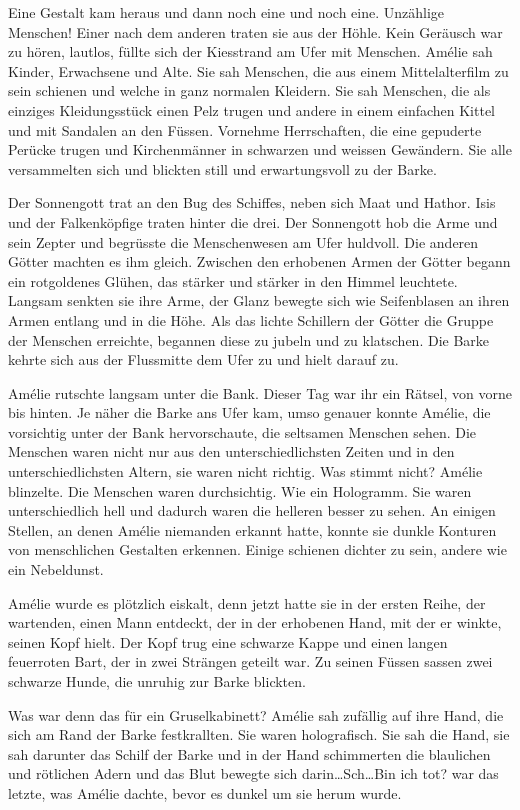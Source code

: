 \documentclass[11pt,titlepage,a5paper]{book}
\begin{document}
Eine Gestalt kam heraus und dann noch eine und noch eine. Unzählige Menschen! Einer nach dem anderen traten sie aus der Höhle. Kein Geräusch war zu hören, lautlos, füllte sich der Kiesstrand am Ufer mit Menschen. Amélie sah Kinder, Erwachsene und Alte. Sie sah Menschen, die aus einem Mittelalterfilm zu sein schienen und welche in ganz normalen Kleidern. Sie sah Menschen, die als einziges Kleidungsstück einen Pelz trugen und andere in einem einfachen Kittel und mit Sandalen an den Füssen. Vornehme Herrschaften, die eine gepuderte Perücke trugen und Kirchenmänner in schwarzen und weissen Gewändern. Sie alle versammelten sich und blickten still und erwartungsvoll zu der Barke. 

Der Sonnengott trat an den Bug des Schiffes, neben sich Maat und Hathor. Isis und der Falkenköpfige traten hinter die drei. Der Sonnengott hob die Arme und sein Zepter und begrüsste die Menschenwesen am Ufer huldvoll. Die anderen Götter machten es ihm gleich. Zwischen den erhobenen Armen der Götter begann ein rotgoldenes Glühen, das stärker und stärker in den Himmel leuchtete. Langsam senkten sie ihre Arme, der Glanz bewegte sich wie Seifenblasen an ihren Armen entlang und in die Höhe. Als das lichte Schillern der Götter die Gruppe der Menschen erreichte, begannen diese zu jubeln und zu klatschen. Die Barke kehrte sich aus der Flussmitte dem Ufer zu und hielt darauf zu. 

Amélie rutschte langsam unter die Bank. Dieser Tag war ihr ein Rätsel, von vorne bis hinten. Je näher die Barke ans Ufer kam, umso genauer konnte Amélie, die vorsichtig unter der Bank hervorschaute, die seltsamen Menschen sehen. Die Menschen waren nicht nur aus den unterschiedlichsten Zeiten und in den unterschiedlichsten Altern, sie waren nicht richtig. Was stimmt nicht? Amélie blinzelte. Die Menschen waren durchsichtig. Wie ein Hologramm. Sie waren unterschiedlich hell und dadurch waren die helleren besser zu sehen. An einigen Stellen, an denen Amélie niemanden erkannt hatte, konnte sie dunkle Konturen von menschlichen Gestalten erkennen. Einige schienen dichter zu sein, andere wie ein Nebeldunst.

Amélie wurde es plötzlich eiskalt, denn jetzt hatte sie in der ersten Reihe, der wartenden, einen Mann entdeckt, der in der erhobenen Hand, mit der er winkte, seinen Kopf hielt. Der Kopf trug eine schwarze Kappe und einen langen feuerroten Bart, der in zwei Strängen geteilt war. Zu seinen Füssen sassen zwei schwarze Hunde, die unruhig zur Barke blickten.

Was war denn das für ein Gruselkabinett? Amélie sah zufällig auf ihre Hand, die sich am Rand der Barke festkrallten. Sie waren holografisch. Sie sah die Hand, sie sah darunter das Schilf der Barke und in der Hand schimmerten die blaulichen und rötlichen Adern und das Blut bewegte sich darin\dots Sch\dots  Bin ich tot? war das letzte, was Amélie dachte, bevor es dunkel um sie herum wurde.   
\end{document}
